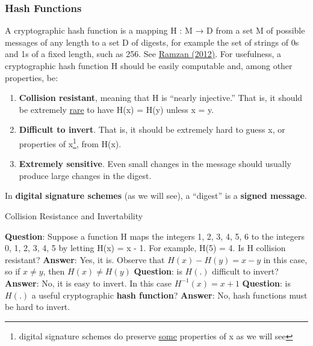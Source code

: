 \documentclass[aspectratio=169]{beamer}
\begin{document}
\begin{frame}\frametitle{Hash Functions}

A cryptographic hash function is a mapping H : M → D from a set M of possible messages of any length to a set D of digests, for example the set of strings of 0s and 1s of a fixed length, such as 256. See \href{https://www.youtube.com/watch?v=0WiTaBI82Mc}{Ramzan (2012)}. 
\vfill \pause 
For usefulness, a cryptographic hash function H should be easily computable and, among other properties, be: 
\begin{enumerate}
    \item \textbf{Collision resistant}, meaning that H is “nearly injective.” That is, it should be extremely \ul{rare} to have H(x) = H(y) unless x = y.\pause 
    \item \textbf{Difficult to invert}. That is, it should be extremely hard to guess x, or properties of x\footnote{digital signature schemes do preserve \ul{some} properties of x as we will see}, from H(x).\pause 
    \item \textbf{Extremely sensitive}. Even small changes in the message should usually produce large changes in the digest.  \pause 
\end{enumerate}
In \textbf{digital signature schemes} (as we will see), a ``digest'' is a \textbf{signed message}. 
\end{frame}


\begin{frame}{Collision Resistance and Invertability}

\textbf{Question}: Suppose a function H maps the integers {1, 2, 3, 4, 5, 6} to the integers {0, 1, 2, 3, 4, 5} by letting H(x) = x - 1. For example, H(5) = 4. Is H collision resistant? \pause 
\vfill 
\textbf{Answer}: Yes, it is. Observe that $H(x) - H(y) = x - y$ in this case, so if $x \ne y$, then $H(x) \ne H(y)$ \pause 
\vfill 
\textbf{Question}: is $H(.)$ difficult to invert? \pause 
\vfill 
\textbf{Answer}: No, it is easy to invert. In this case $H^{-1}(x) = x + 1$ \pause \vfill 
\textbf{Question}: is $H(.)$ a useful cryptographic \textbf{hash function}? \pause 
\vfill 
\textbf{Answer}: No, hash functions must be hard to invert. 
    
\end{frame}
\end{document}
